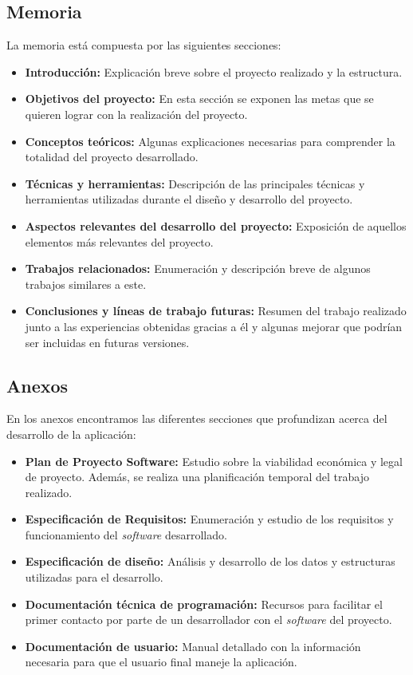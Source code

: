 \subsection{Memoria}
La memoria está compuesta por las siguientes secciones:
\begin{itemize}
\item \textbf{Introducción:} Explicación breve sobre el proyecto realizado y la estructura.
\item \textbf{Objetivos del proyecto:} En esta sección se exponen las metas que se quieren lograr con la realización del proyecto.
\item \textbf{Conceptos teóricos:} Algunas explicaciones necesarias para comprender la totalidad del proyecto desarrollado.
\item \textbf{Técnicas y herramientas:} Descripción de las principales técnicas y herramientas utilizadas durante el diseño y desarrollo del proyecto.
\item \textbf{Aspectos relevantes del desarrollo del proyecto:} Exposición de aquellos elementos más relevantes del proyecto.
\item \textbf{Trabajos relacionados:} Enumeración y descripción breve de algunos trabajos similares a este.
\item \textbf{Conclusiones y líneas de trabajo futuras:} Resumen del trabajo realizado junto a las experiencias obtenidas gracias a él y algunas mejorar que podrían ser incluidas en futuras versiones.
\end{itemize}

\subsection{Anexos}
En los anexos encontramos las diferentes secciones que profundizan acerca del desarrollo de la aplicación:
\begin{itemize}
\item \textbf{Plan de Proyecto Software:} Estudio sobre la viabilidad económica y legal de proyecto. Además, se realiza una planificación temporal del trabajo realizado.
\item \textbf{Especificación de Requisitos:} Enumeración y estudio de los requisitos y funcionamiento del \textit{software} desarrollado.
\item \textbf{Especificación de diseño:} Análisis y desarrollo de los datos y estructuras utilizadas para el desarrollo.
\item \textbf{Documentación técnica de programación:} Recursos para facilitar el primer contacto por parte de un desarrollador con el \textit{software} del proyecto.
\item \textbf{Documentación de usuario:} Manual detallado con la información necesaria para que el usuario final maneje la aplicación.
\end{itemize}

